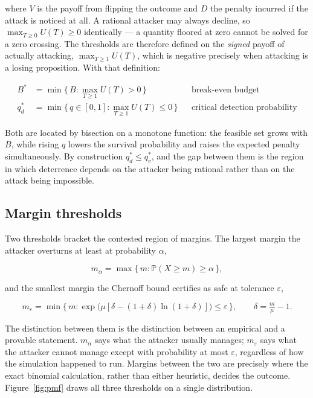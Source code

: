 \documentclass[11pt,a4paper]{article}
\newcommand{\Prob}{\mathbb{P}}
\newcommand{\figref}[1]{Figure~\ref{#1}}
\begin{document}
where $V$ is the payoff from flipping the outcome and $D$ the penalty incurred if the
attack is noticed at all. A rational attacker may always decline, so $\max_{T \geq 0}
U(T) \geq 0$ identically --- a quantity floored at zero cannot be solved for a zero
crossing. The thresholds are therefore defined on the \emph{signed} payoff of actually
attacking, $\max_{T \geq 1} U(T)$, which is negative precisely when attacking is a
losing proposition. With that definition:

\begin{align}
B^{*} &= \min \{\, B : \max_{T \geq 1} U(T) > 0 \,\}
  &&\text{break-even budget} \label{eq:t4}\\
q_d^{*} &= \min \{\, q \in [0,1] : \max_{T \geq 1} U(T) \leq 0 \,\}
  &&\text{critical detection probability} \label{eq:t5}
\end{align}

Both are located by bisection on a monotone function: the feasible set grows with $B$,
while rising $q$ lowers the survival probability and raises the expected penalty
simultaneously. By construction $q_d^{*} \leq q_v^{*}$, and the gap between them is the
region in which deterrence depends on the attacker being rational rather than on the
attack being impossible.

\subsection{Margin thresholds}

Two thresholds bracket the contested region of margins. The largest margin the attacker
overturns at least at probability $\alpha$,

\begin{equation}
m_{\alpha} = \max \{\, m : \Prob(X \geq m) \geq \alpha \,\},
\label{eq:t7}
\end{equation}

and the smallest margin the Chernoff bound certifies as safe at tolerance $\varepsilon$,

\begin{equation}
m_{\varepsilon} = \min \{\, m : \exp\!\big(\mu[\delta - (1+\delta)\ln(1+\delta)]\big)
  \leq \varepsilon \,\}, \qquad \delta = \tfrac{m}{\mu} - 1 .
\label{eq:t6}
\end{equation}

The distinction between them is the distinction between an empirical and a provable
statement. $m_{\alpha}$ says what the attacker usually manages; $m_{\varepsilon}$ says
what the attacker cannot manage except with probability at most $\varepsilon$,
regardless of how the simulation happened to run. Margins between the two are precisely
where the exact binomial calculation, rather than either heuristic, decides the outcome.
\figref{fig:pmf} draws all three thresholds on a single distribution.
\end{document}
